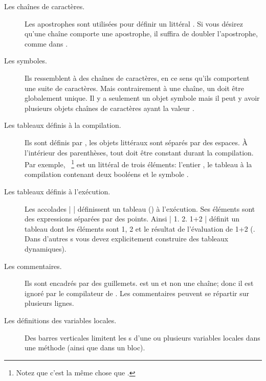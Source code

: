 \documentclass[a4paper,10pt,twoside]{book}
\begin{document}
\begin{description}
\item[Les chaînes de caractères.] Les apostrophes sont utilisées pour définir un  littéral .
Si vous désirez qu'une chaîne comporte une apostrophe, il suffira de doubler l'apostrophe, comme dans .

\item[Les symboles.] Ils ressemblent à des chaînes de caractères, en ce sens qu'ils comportent une suite de caractères.  
Mais contrairement à une chaîne, un  doit être globalement unique.
Il y a seulement un objet symbole  mais il peut y avoir plusieurs objets chaînes de caractères ayant la valeur .

\item[Les tableaux définis à la compilation.] Ils sont définis par \ct{#( )}, les objets littéraux 
sont séparés par des espaces.
À l'intérieur des parenthèses, tout doit être constant durant la compilation.
Par exemple, ~\footnote{Notez que c'est la même chose 
que .} est un  littéral de 
trois éléments: l'entier , le tableau à la compilation contenant deux 
booléens et le symbole .


\item[Les tableaux définis à l'exécution.] Les accolades \ct|{ }|
  définissent un tableau () à l'exécution.
Ses éléments sont des expressions séparées par des points.
Ainsi \ct|{ 1. 2. 1+2 }| définit un tableau dont les éléments sont 1, 2 et le résultat de l'évaluation de 1+2
(. %
Dans d'autres \st{}s vous devez explicitement construire des tableaux dynamiques).

\item[Les commentaires.] Ils sont encadrés par des guillemets.
 est un  et non une
chaîne; donc il est ignoré par le compilateur de \pharo.
Les commentaires peuvent se répartir sur plusieurs lignes.
		
\item[Les définitions des variables locales.] Des barres
  verticales \ct{| |} limitent les
  s d'une ou plusieurs variables
  locales dans une méthode (ainsi que dans un bloc).


\end{description}
\end{document}
